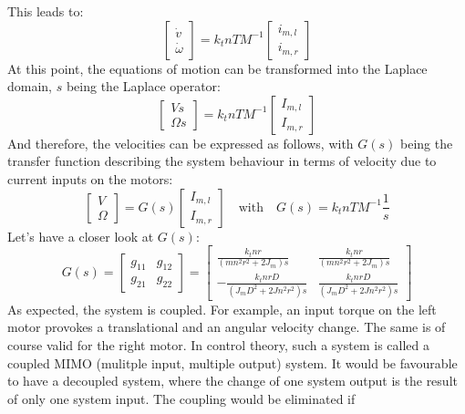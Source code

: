 \documentclass[a4paper, 11pt]{article}
\begin{document}
This leads to:
\begin{equation}
\begin{bmatrix}
\dot{v}\\ \dot{\omega}
\end{bmatrix}
= 
k_tnTM^{-1}
\begin{bmatrix}
i_{m,l}\\ i_{m,r}
\end{bmatrix}
\end{equation}
At this point, the equations of motion can be transformed into the Laplace domain, $s$ being the Laplace operator:
\begin{equation}
\begin{bmatrix}
Vs\\ \Omega s
\end{bmatrix}
= 
k_tnTM^{-1}
\begin{bmatrix}
I_{m,l}\\ I_{m,r}
\end{bmatrix}
\end{equation}
And therefore, the velocities can be expressed as follows, with $G(s)$ being the transfer function describing the system behaviour in terms of velocity due to current inputs on the motors:
\begin{equation}
\begin{bmatrix}
V\\ \Omega
\end{bmatrix}
= G(s)
\begin{bmatrix}
I_{m,l}\\ I_{m,r}
\end{bmatrix}
\quad \textrm{with} \quad
G(s) = k_tnTM^{-1}\frac{1}{s} 
\end{equation}
Let's have a closer look at $G(s)$:
\begin{equation}
	G(s) = 
	\begin{bmatrix}
	g_{11} & g_{12} \\
	g_{21} & g_{22}
	\end{bmatrix}
	=
	\begin{bmatrix}
	\frac{k_tnr}{(mn^2r^2 + 2J_m)s} & \frac{k_tnr}{(mn^2r^2 + 2J_m)s}\\[8pt]
	-\frac{k_tnrD}{(J_mD^2 + 2Jn^2r^2)s} & \frac{k_tnrD}{(J_mD^2 + 2Jn^2r^2)s}
	\end{bmatrix}
\end{equation}
As expected, the system is coupled. For example, an input torque on the left motor provokes a translational and an angular velocity change. The same is of course valid for the right motor. In control theory, such a system is called a coupled MIMO (mulitple input, multiple output) system. It would be favourable to have a decoupled system, where the change of one system output is the result of only one system input. The coupling would be eliminated if 
\end{document}
